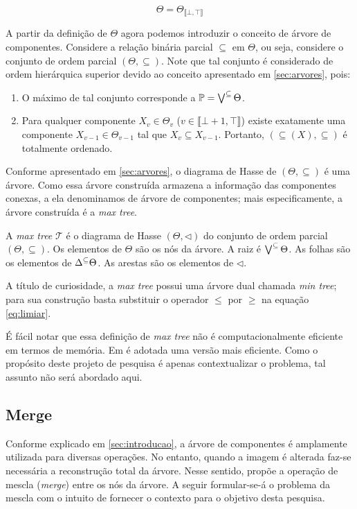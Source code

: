 $$\Theta = \Theta_{\llbracket \bot, \top \rrbracket}$$

A partir da definição de $\Theta$ agora podemos introduzir o conceito de
árvore de componentes. Considere a relação binária parcial $\subseteq$ em 
$\Theta$, ou seja, considere o conjunto de ordem parcial $(\Theta, \subseteq)$.
Note que tal conjunto é considerado de ordem hierárquica superior
devido ao conceito apresentado em \ref{sec:arvores}, pois:

\begin{enumerate}
    \item O máximo de tal conjunto corresponde a $\mathbb{P} = \bigvee^{\subseteq} \Theta$.
    \item Para qualquer componente $X_v \in \Theta_v$ ($v \in \llbracket \bot + 1, \top \rrbracket$)
    existe exatamente uma componente $X_{v-1} \in \Theta_{v-1}$ tal que $X_v \subseteq X_{v-1}$.
    Portanto, $(\subseteq(X), \subseteq)$ é totalmente ordenado.
\end{enumerate}

Conforme apresentado em \ref{sec:arvores}, o diagrama de Hasse de 
$(\Theta, \subseteq)$ é uma árvore. Como essa árvore construída armazena a
informação das componentes conexas, a ela denominamos de árvore de componentes;
mais especificamente, a árvore construída é a \textit{max tree}.

\begin{definition}
    A \textit{max tree} $\mathscr{T}$ é o diagrama de Hasse $(\Theta, \lhd)$ do conjunto
    de ordem parcial $(\Theta, \subseteq)$. Os elementos de $\Theta$ são
    os nós da árvore. A raiz é $\bigvee^{\subseteq}\Theta$. As folhas são
    os elementos de $\Delta^{\subseteq}\Theta$. As arestas são os
    elementos de $\lhd$.
\end{definition}

A título de curiosidade, a \textit{max tree} possui uma árvore dual chamada
\textit{min tree}; para sua construção basta substituir o operador
$\le$ por $\ge$ na equação \eqref{eq:limiar}.

É fácil notar que essa definição de \textit{max tree} não é computacionalmente eficiente em termos de memória.
Em \cite{luz_alves_component_2026} é adotada uma versão mais eficiente. Como
o propósito deste projeto de pesquisa é apenas contextualizar o problema, tal assunto não será abordado aqui.

\subsection{Merge}
Conforme explicado em \ref{sec:introducao}, a árvore de componentes é amplamente
utilizada para diversas operações. No entanto, quando a imagem é alterada
faz-se necessária a reconstrução total da árvore. Nesse sentido, \cite{luz_alves_component_2026}
propõe a operação de mescla (\textit{merge}) entre os nós da árvore. A seguir
formular-se-á o problema da mescla com o intuito de fornecer o contexto para o objetivo desta pesquisa.

